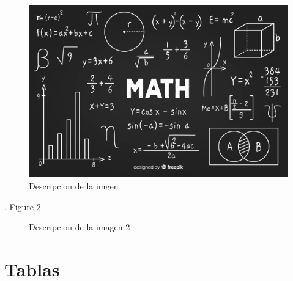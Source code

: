 \documentclass[12pt, letterpaper]{article}
\begin{document}
\begin{figure}[h]
    \centering
    \includegraphics[width=0.8 \textwidth]{image.jpg}
    \caption{Descripcion de la imgen}
    \label{fig:imagen 1}
\end{figure}

\blindtext. Figure \ref{fig:imagen 2}

\begin{figure}[H]
    \centering
    \hfill

    \caption{Descripcion de la imagen 2}
    \label{fig:imagen 2}
\end{figure}
\section{Tablas}
\end{document}

